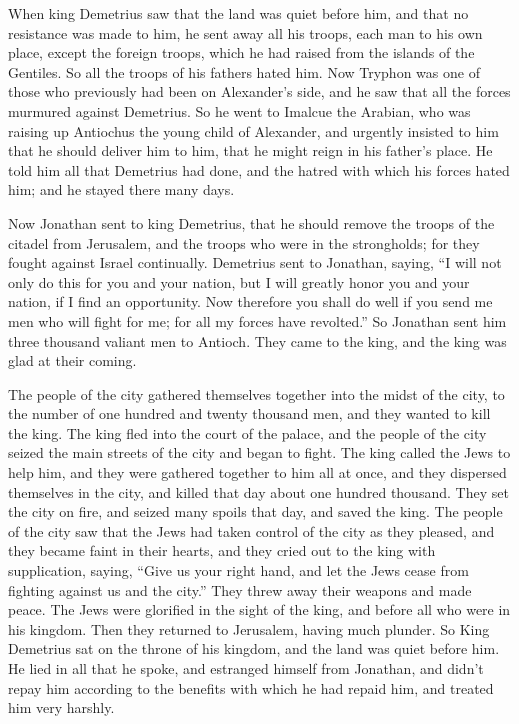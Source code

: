  When king Demetrius saw that the land was quiet before
him, and that no resistance was made to him, he sent away all his
troops, each man to his own place, except the foreign troops, which he
had raised from the islands of the Gentiles. So all the troops of his
fathers hated him.  Now Tryphon was one of those who
previously had been on Alexander's side, and he saw that all the forces
murmured against Demetrius. So he went to Imalcue the Arabian, who was
raising up Antiochus the young child of Alexander,  and
urgently insisted to him that he should deliver him to him, that he
might reign in his father's place. He told him all that Demetrius had
done, and the hatred with which his forces hated him; and he stayed
there many days.

 Now Jonathan sent to king Demetrius, that he should
remove the troops of the citadel from Jerusalem, and the troops who were
in the strongholds; for they fought against Israel continually.
 Demetrius sent to Jonathan, saying, ``I will not only do
this for you and your nation, but I will greatly honor you and your
nation, if I find an opportunity.  Now therefore you
shall do well if you send me men who will fight for me; for all my
forces have revolted.''  So Jonathan sent him three
thousand valiant men to Antioch. They came to the king, and the king was
glad at their coming.

 The people of the city gathered themselves together into
the midst of the city, to the number of one hundred and twenty thousand
men, and they wanted to kill the king.  The king fled
into the court of the palace, and the people of the city seized the main
streets of the city and began to fight.  The king called
the Jews to help him, and they were gathered together to him all at
once, and they dispersed themselves in the city, and killed that day
about one hundred thousand.  They set the city on fire,
and seized many spoils that day, and saved the king.  The
people of the city saw that the Jews had taken control of the city as
they pleased, and they became faint in their hearts, and they cried out
to the king with supplication, saying,  ``Give us your
right hand, and let the Jews cease from fighting against us and the
city.''  They threw away their weapons and made peace.
The Jews were glorified in the sight of the king, and before all who
were in his kingdom. Then they returned to Jerusalem, having much
plunder.  So King Demetrius sat on the throne of his
kingdom, and the land was quiet before him.  He lied in
all that he spoke, and estranged himself from Jonathan, and didn't repay
him according to the benefits with which he had repaid him, and treated
him very harshly.

